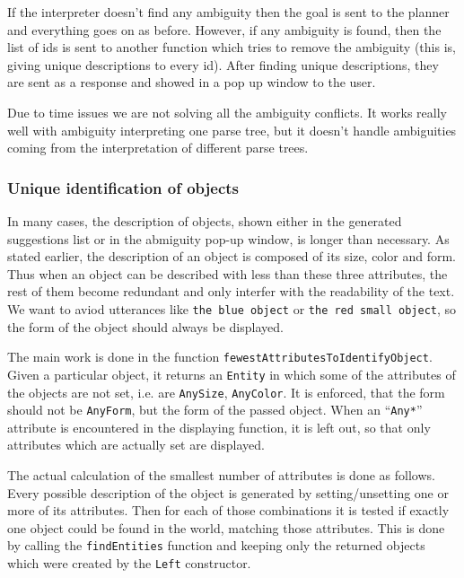 \documentclass[11pt]{article}
\begin{document}
          If the interpreter doesn't find any ambiguity then the goal is sent 
          to the planner and everything goes on as before. However, if any 
          ambiguity is found, then the list of ids is sent to another function 
          which tries to remove the ambiguity (this is, giving unique 
          descriptions to every id). After finding unique descriptions, they 
          are sent as a response and showed in a pop up window to the user.

          Due to time issues we are not solving all the ambiguity conflicts. It 
          works really well with ambiguity interpreting one parse tree, but it 
          doesn't handle ambiguities coming from the interpretation of 
          different parse trees.

      \subsubsection{Unique identification of objects}

      In many cases, the description of objects, shown either in the generated 
      suggestions list or in the abmiguity pop-up window, is longer than 
      necessary. As stated earlier, the description of an object is composed of 
      its size, color and form. Thus when an object can be described with less 
      than these three attributes, the rest of them become redundant and only 
      interfer with the readability of the text. We want to aviod utterances 
      like \texttt{the blue object} or \texttt{the red small object}, so the 
      form of the object should always be displayed.

      The main work is done in the function 
      \texttt{fewestAttributesToIdentifyObject}. Given a particular object, it 
      returns an \texttt{Entity} in which some of the attributes of the objects 
      are not set, i.e. are \texttt{AnySize}, \texttt{AnyColor}. It is enforced, 
      that the form should not be \texttt{AnyForm}, but the form of the passed 
      object. When an ``\texttt{Any*}'' attribute is encountered in the 
      displaying function, it is left out, so that only attributes which are 
      actually set are displayed.

      The actual calculation of the smallest number of attributes is done as 
      follows. Every possible description of the object is generated by 
      setting/unsetting one or more of its attributes. Then for each of those 
      combinations it is tested if exactly one object could be found in the 
      world, matching those attributes. This is done by calling the 
      \texttt{findEntities} function and keeping only the returned objects 
      which were created by the \texttt{Left} constructor.
\end{document}
